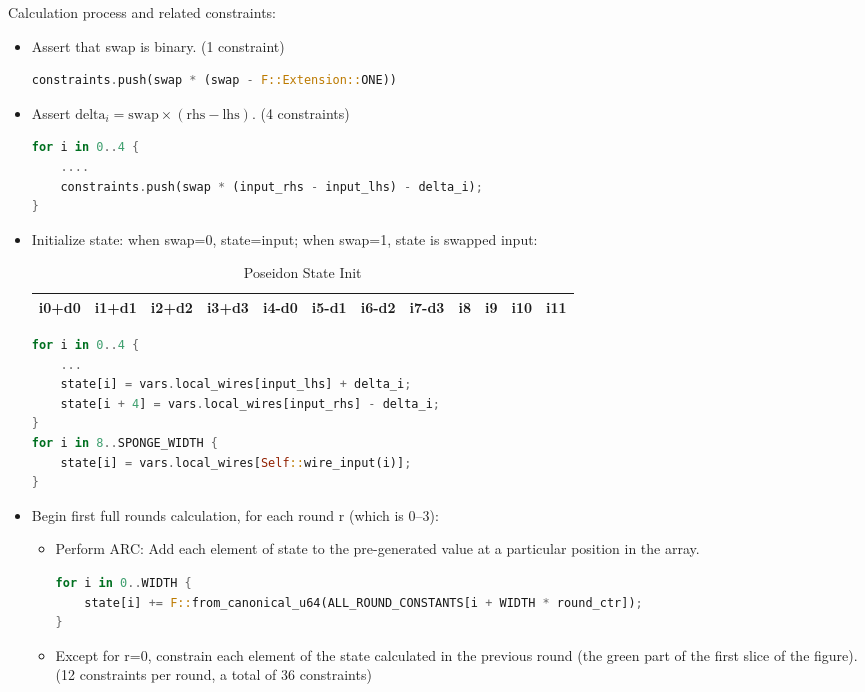 Calculation process and related constraints:
\begin{itemize}
    \item Assert that swap is binary. (1 constraint)
    \begin{lstlisting}[language=rust]
constraints.push(swap * (swap - F::Extension::ONE))
    \end{lstlisting}
    \item Assert $\text{delta}_i = \text{swap} \times (\text{rhs} - \text{lhs})$. (4 constraints)
    \begin{lstlisting}[language=rust]
for i in 0..4 {
    ....
    constraints.push(swap * (input_rhs - input_lhs) - delta_i);
}
    \end{lstlisting}
    \item Initialize state: when swap=0, state=input; when swap=1, state is swapped input:
    \begin{table}[!ht]
        \centering
        \begin{tabular}{|c|c|c|c|c|c|c|c|c|c|c|c|}
            \hline
            i0+d0 & i1+d1 & i2+d2 & i3+d3 & i4-d0 & i5-d1 & i6-d2 & i7-d3 & i8 & i9 & i10 & i11 \\
            \hline
        \end{tabular}
        \caption{Poseidon State Init}
        \label{tab:poseidon-state-init}
    \end{table}
    \begin{lstlisting}[language=rust]
for i in 0..4 {
    ...
    state[i] = vars.local_wires[input_lhs] + delta_i;
    state[i + 4] = vars.local_wires[input_rhs] - delta_i;
}
for i in 8..SPONGE_WIDTH {
    state[i] = vars.local_wires[Self::wire_input(i)];
}
    \end{lstlisting}
    \item Begin first full rounds calculation, for each round r (which is 0--3):
    \begin{itemize}
        \item Perform ARC: Add each element of state to the pre-generated value at a particular position in the array.
        \begin{lstlisting}[language=rust]
for i in 0..WIDTH {
    state[i] += F::from_canonical_u64(ALL_ROUND_CONSTANTS[i + WIDTH * round_ctr]);
}
        \end{lstlisting}
        \item Except for r=0, constrain each element of the state calculated in the previous round (the green part of the first slice of the figure). 
        (12 constraints per round, a total of 36 constraints)

\end{itemize}
\end{itemize}
